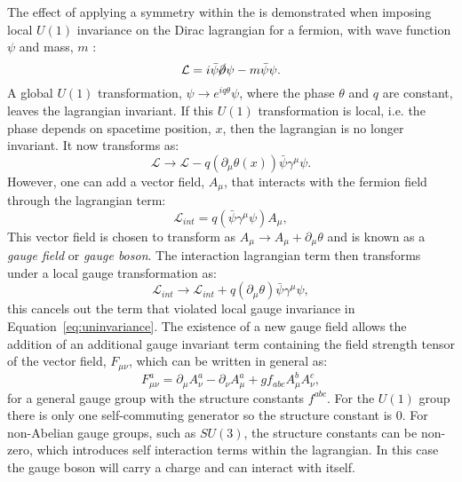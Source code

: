The effect of applying a symmetry within the \SM is demonstrated when
imposing local $U(1)$ invariance on the Dirac lagrangian for a
fermion, with wave function $\psi$ and mass, $m$ \cite{Griffiths:111880}:
\begin{equation}
\mathcal{L}=i\bar{\psi}\cancel{\partial}\psi-m\bar{\psi}\psi.
\end{equation}
A global $U(1)$ transformation, $\psi\rightarrow e^{iq\theta}\psi$,
where the phase $\theta$ and $q$ are constant,
leaves the lagrangian invariant. If this $U(1)$ transformation is
local, i.e. the phase depends on spacetime position, $x$, then the
lagrangian is no longer invariant. It now transforms as:
\begin{equation}
\label{eq:uninvariance}
\mathcal{L}\rightarrow\mathcal{L}-q(\partial_{\mu}\theta(x))\bar{\psi}\gamma^{\mu}\psi.
\end{equation}
However, one can add a vector field, $A_{\mu}$, that interacts with
the fermion field through the lagrangian term:
\begin{equation}
\mathcal{L}_{int}=q(\bar{\psi}\gamma^{\mu}\psi) A_{\mu},
\end{equation}
This vector field is chosen to transform as $A_{\mu}\rightarrow
A_{\mu}+\partial_{\mu}\theta$ and is known as a \emph{gauge field} or
\emph{gauge boson}. The interaction lagrangian term then transforms
under a local gauge transformation as:
\begin{equation}
\mathcal{L}_{int}\rightarrow \mathcal{L}_{int}+q(\partial_{\mu}\theta)\bar{\psi}\gamma^{\mu}\psi,
\end{equation}
this cancels out the term that violated local gauge invariance in
Equation~\ref{eq:uninvariance}. The existence of a new gauge field
allows the addition of an additional gauge invariant term containing
the field strength tensor of the vector field, $F_{\mu\nu}$, which can
be written in general as:
\begin{equation}
F_{\mu\nu}^a=\partial_{\mu}A_{\nu}^a-\partial_{\nu}A_{\mu}^a+gf_{abc}A_{\mu}^{b}A_{\nu}^{c},
\end{equation}
for a general gauge group with the structure constants $f^{abc}$. For
the $U(1)$ group there is only one self-commuting generator so the
structure constant is 0. For non-Abelian gauge groups, such as
$SU(3)$, the structure constants can be non-zero, which introduces
self interaction terms within the lagrangian. In this case the gauge
boson will carry a charge and can interact with itself.

